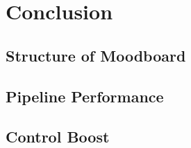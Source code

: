 \chapter{Conclusion}

\section{Structure of Moodboard}

\section{Pipeline Performance}

\section{Control Boost}